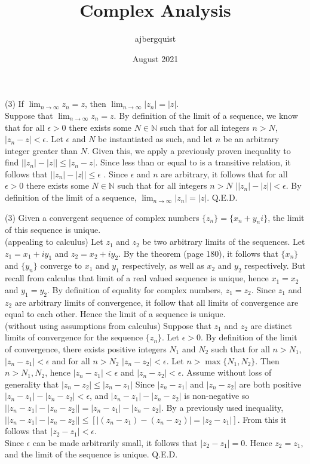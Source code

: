 \documentclass{article}
\title{Complex Analysis}
\author{ajbergquist }
\date{August 2021}
\theoremstyle{definition}
\newcommand{\N}{\mathbb{N}}
\newcommand{\pf}{\fbox{proof}}
\newcommand{\prop}{\fbox{proposition}}
\newcommand{\cs}[1]{\color{blue}{#1}\normalcolor}
\begin{document}
\prop (3) If $\lim_{n\to \infty}z_n = z$, then $\lim_{n\to \infty}|z_n| = |z|$.\\

\pf Suppose that $\lim_{n\to \infty}z_n = z$. By definition of the limit of a sequence, we know that for all $\epsilon > 0$ there exists some $N\in \N$ such that for all integers $n>N$, $|z_n - z| < \epsilon$. Let $\epsilon$ and $N$ be instantiated as such, and let $n$ be an arbitrary integer greater than $N$. Given this, we apply a previously proven inequality to find $\big| |z_n| - |z| \big| \le |z_n-z|$. Since less than or equal to is a transitive relation, it follows that $\big| |z_n| - |z| \big| \le \epsilon$ \cs{You can have $<$ here}. Since $\epsilon$ and $n$ are arbitrary, it follows that for all $\epsilon > 0$ there exists some $N\in \N$ such that for all integers $n> N$ $\big| |z_n| - |z| \big| < \epsilon$. By definition of the limit of a sequence, $\lim_{n\to \infty}|z_n| = |z|$. Q.E.D.\\

\cs{5/5}

\prop (3) Given a convergent sequence of complex numbers $\{z_n\} = \{x_n + y_n i\}$, the limit of this sequence is unique.\\

\pf(appealing to calculus) Let $z_1$ and $z_2$ be two arbitrary limits of the sequences. Let $z_1 = x_1 + iy_1$ and $z_2 = x_2 + iy_2$. By the theorem (page 180), it follows that $\{x_n\}$ and $\{y_n\}$ converge to $x_1$ and $y_1$ respectively, as well as $x_2$ and $y_2$ respectively. But recall from calculus that limit of a real valued sequence is unique, hence $x_1 = x_2$ and $y_1 = y_2$. By definition of equality for complex numbers, $z_1 = z_2$. Since $z_1$ and $z_2$ are arbitrary limits of convergence, it follow that all limits of convergence are equal to each other. Hence the limit of a sequence is unique. \\

\pf(without using assumptions from calculus) Suppose that $z_1$ and $z_2$ are distinct limits of convergence for the sequence $\{z_n\}$. Let $\epsilon > 0$. By definition of the limit of convergence, there exists positive integers $N_1$ and $N_2$ such that for all $n > N_1$, $|z_n - z_1| < \epsilon$ and for all $n> N_2 $ $|z_n - z_2| < \epsilon$. Let $n > \max\{N_1,N_2\}$. Then $n> N_1,N_2$, hence $|z_n - z_1| < \epsilon$ and $|z_n - z_2| < \epsilon$. Assume without loss of generality that $|z_n - z_2| \le |z_n - z_1| $ Since $|z_n - z_1|$ and $|z_n - z_2|$ are both positive$|z_n - z_1| - |z_n - z_2| < \epsilon$, and $|z_n - z_1| - |z_n - z_2|$ is non-negative so $\big||z_n - z_1| - |z_n - z_2|\big| = |z_n - z_1| - |z_n - z_2|$. By a previously used inequality, $\big||z_n - z_1| - |z_n - z_2|\big| \le [|(z_n - z_1) - (z_n - z_2)| = |z_2-z_1|].$ From this it follows that $|z_2-z_1| < \epsilon$.\\

Since $\epsilon$ can be made arbitrarily small, it follows that $|z_2 - z_1| = 0$. Hence $z_2 = z_1$, and the limit of the sequence is unique. Q.E.D.

\cs{TWO proofs?!? Fancy! 5/5}

\cs{10/10}
\end{document}
